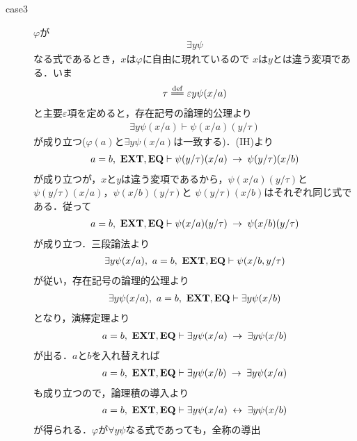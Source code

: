 \begin{sketch}
\begin{description}
\begin{description}
					\item[case3]
						$\varphi$が
						\begin{align}
							\exists y \psi
						\end{align}
						なる式であるとき，$x$は$\varphi$に自由に現れているので
						$x$は$y$とは違う変項である．いま
						\begin{align}
							\tau \defeq \varepsilon y \psi(x/a)
						\end{align}
						と主要$\varepsilon$項を定めると，存在記号の論理的公理より
						\begin{align}
							\exists y \psi(x/a) \vdash \psi(x/a)(y/\tau)
						\end{align}
						が成り立つ($\varphi(a)$と$\exists y \psi(x/a)$は一致する)．(IH)より
						\begin{align}
							a = b,\ \mbox{{\bf EXT}},\mbox{{\bf EQ}} \vdash 
							\psi(y/\tau)(x/a) \hspace{0.25em}\rightarrow\hspace{0.25em} \psi(y/\tau)(x/b)
						\end{align}
						が成り立つが，$x$と$y$は違う変項であるから，$\psi(x/a)(y/\tau)$と
						$\psi(y/\tau)(x/a)$，$\psi(x/b)(y/\tau)$と
						$\psi(y/\tau)(x/b)$はそれぞれ同じ式である．従って
						\begin{align}
							a = b,\ \mbox{{\bf EXT}},\mbox{{\bf EQ}} \vdash 
							\psi(x/a)(y/\tau) \hspace{0.25em}\rightarrow\hspace{0.25em} \psi(x/b)(y/\tau)
						\end{align}
						が成り立つ．三段論法より
						\begin{align}
							\exists y \psi(x/a),\ a = b,\ \mbox{{\bf EXT}},\mbox{{\bf EQ}} \vdash 
							\psi(x/b,y/\tau)
						\end{align}
						が従い，存在記号の論理的公理より
						\begin{align}
							\exists y \psi(x/a),\ a = b,\ \mbox{{\bf EXT}},\mbox{{\bf EQ}} \vdash 
							\exists y \psi(x/b)
						\end{align}
						となり，演繹定理より
						\begin{align}
							a = b,\ \mbox{{\bf EXT}},\mbox{{\bf EQ}} \vdash 
							\exists y \psi(x/a) \hspace{0.25em}\rightarrow\hspace{0.25em} \exists y \psi(x/b)
						\end{align}
						が出る．$a$と$b$を入れ替えれば
						\begin{align}
							a = b,\ \mbox{{\bf EXT}},\mbox{{\bf EQ}} \vdash 
							\exists y \psi(x/b) \hspace{0.25em}\rightarrow\hspace{0.25em} \exists y \psi(x/a)
						\end{align}
						も成り立つので，論理積の導入より
						\begin{align}
							a = b,\ \mbox{{\bf EXT}},\mbox{{\bf EQ}} \vdash 
							\exists y \psi(x/a) \hspace{0.25em}\leftrightarrow\hspace{0.25em} \exists y \psi(x/b)
						\end{align}
						が得られる．$\varphi$が$\forall y \psi$なる式であっても，全称の導出

\end{description}
\end{description}
\end{sketch}
